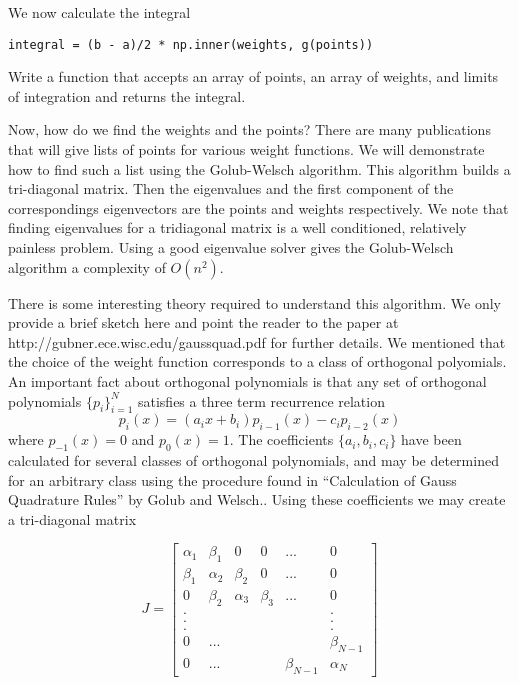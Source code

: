 We now calculate the integral

\begin{lstlisting}
integral = (b - a)/2 * np.inner(weights, g(points))
\end{lstlisting}

\begin{problem}

Write a function that accepts an array of points, an array of weights, and limits of integration and returns the integral.

\end{problem}

Now, how do we find the weights and the points?  There are many publications that will give lists of points for various weight functions.  We will demonstrate how to find such a list using the Golub-Welsch algorithm.  This algorithm builds a tri-diagonal matrix.  Then the eigenvalues and the first component of the correspondings eigenvectors are the points and weights respectively.  We note that finding eigenvalues for a tridiagonal matrix is a well conditioned, relatively painless problem.  Using a good eigenvalue solver gives the Golub-Welsch algorithm a complexity of $O(n^2)$.

There is some interesting theory required to understand this algorithm.  We only provide a brief sketch here and point the reader to the paper at http://gubner.ece.wisc.edu/gaussquad.pdf for further details.  We mentioned that the choice of the weight function corresponds to a class of orthogonal polyomials.  An important fact about orthogonal polynomials is that any set of orthogonal polynomials $\{p_i\}_{i=1}^N$ satisfies a three term recurrence relation
\[
p_i(x) = (a_ix + b_i)p_{i-1}(x) - c_ip_{i-2}(x)
\]
where $p_{-1}(x) = 0$ and $p_0(x) = 1$.  The coefficients $\{a_i, b_i, c_i\}$ have been calculated for several classes of orthogonal polynomials, and may be determined for an arbitrary class using the procedure found in ``Calculation of Gauss Quadrature Rules'' by Golub and Welsch..  Using these coefficients we may create a tri-diagonal matrix

\[
J = \begin{bmatrix}

\alpha_1 & \beta_1 & 0 & 0 & ... & 0 \\
\beta_1 & \alpha_2 & \beta_2 & 0 & ... & 0 \\
0 & \beta_2 & \alpha_3 & \beta_3 & ... & 0 \\
. & & & & & . \\
. & & & & & . \\
. & & & & & . \\
0 & ... & & & & \beta_{N-1} \\
0 & ... & & & \beta_{N-1} & \alpha_N

\end{bmatrix}
\]

